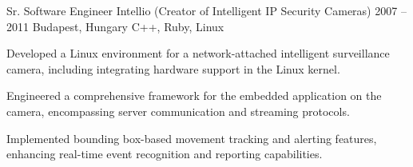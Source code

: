 \cvexperience
  {Sr. Software Engineer}
  {Intellio (Creator of Intelligent IP Security Cameras)}
  {2007 -- 2011}
  {Budapest, Hungary}
  {C++, Ruby, Linux}
  {%
    \item Developed a Linux environment for a network-attached intelligent surveillance camera, including integrating hardware support in the Linux kernel.
    \item Engineered a comprehensive framework for the embedded application on the camera, encompassing server communication and streaming protocols.
    \item Implemented bounding box-based movement tracking and alerting features, enhancing real-time event recognition and reporting capabilities.
  }
